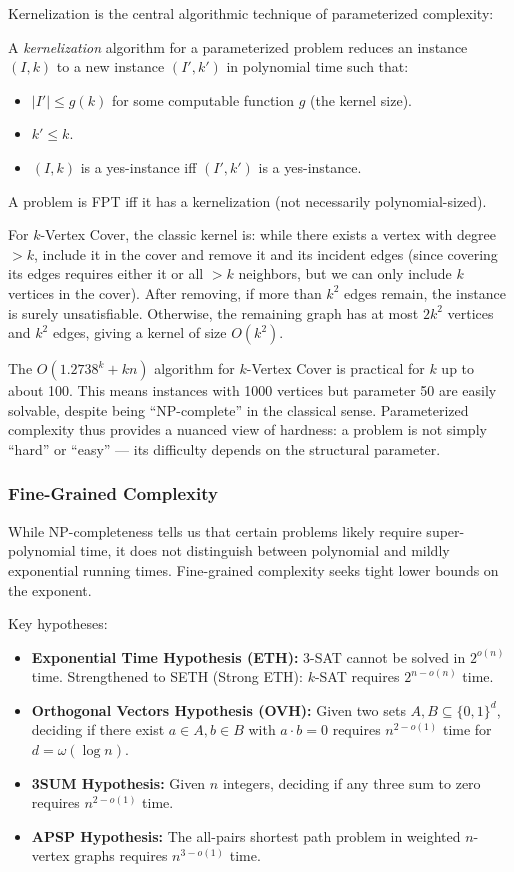 Kernelization is the central algorithmic technique of parameterized complexity:

\begin{definition}[Kernelization]
A \emph{kernelization} algorithm for a parameterized problem reduces an instance $(I,k)$ to a new instance $(I',k')$ in polynomial time such that:
\begin{itemize}
\item $|I'| \le g(k)$ for some computable function $g$ (the kernel size).
\item $k' \le k$.
\item $(I,k)$ is a yes-instance iff $(I',k')$ is a yes-instance.
\end{itemize}
A problem is FPT iff it has a kernelization (not necessarily polynomial-sized).
\end{definition}

For $k$-Vertex Cover, the classic kernel is: while there exists a vertex with degree $> k$, include it in the cover and remove it and its incident edges (since covering its edges requires either it or all $>k$ neighbors, but we can only include $k$ vertices in the cover). After removing, if more than $k^2$ edges remain, the instance is surely unsatisfiable. Otherwise, the remaining graph has at most $2k^2$ vertices and $k^2$ edges, giving a kernel of size $O(k^2)$.

The $O(1.2738^k + kn)$ algorithm for $k$-Vertex Cover is practical for $k$ up to about 100. This means instances with 1000 vertices but parameter 50 are easily solvable, despite being ``NP-complete'' in the classical sense. Parameterized complexity thus provides a nuanced view of hardness: a problem is not simply ``hard'' or ``easy'' — its difficulty depends on the structural parameter.

\subsubsection*{Fine-Grained Complexity}
\label{sec:np:finegrained}

While NP-completeness tells us that certain problems likely require super-polynomial time, it does not distinguish between polynomial and mildly exponential running times. Fine-grained complexity seeks tight lower bounds on the exponent.

Key hypotheses:
\begin{itemize}
\item \textbf{Exponential Time Hypothesis (ETH):} 3-SAT cannot be solved in $2^{o(n)}$ time. Strengthened to SETH (Strong ETH): $k$-SAT requires $2^{n - o(n)}$ time.
\item \textbf{Orthogonal Vectors Hypothesis (OVH):} Given two sets $A,B \subseteq \{0,1\}^d$, deciding if there exist $a \in A, b \in B$ with $a \cdot b = 0$ requires $n^{2-o(1)}$ time for $d = \omega(\log n)$.
\item \textbf{3SUM Hypothesis:} Given $n$ integers, deciding if any three sum to zero requires $n^{2-o(1)}$ time.
\item \textbf{APSP Hypothesis:} The all-pairs shortest path problem in weighted $n$-vertex graphs requires $n^{3-o(1)}$ time.
\end{itemize}

